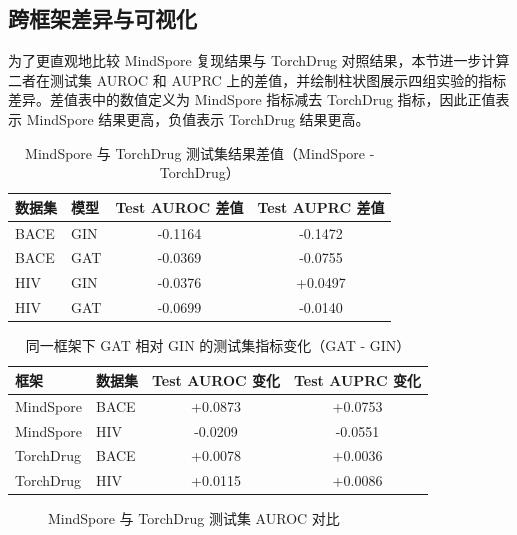 \documentclass[12pt,hyperref,a4paper,UTF8]{ctexart}
\begin{document}
\subsection{跨框架差异与可视化}

为了更直观地比较 MindSpore 复现结果与 TorchDrug 对照结果，本节进一步计算二者在测试集 AUROC 和 AUPRC 上的差值，并绘制柱状图展示四组实验的指标差异。差值表中的数值定义为 MindSpore 指标减去 TorchDrug 指标，因此正值表示 MindSpore 结果更高，负值表示 TorchDrug 结果更高。

\begin{table}[H]
  \centering
  \caption{MindSpore 与 TorchDrug 测试集结果差值（MindSpore - TorchDrug）}
  \label{tab:diff}
  \begin{tabular}{l l c c}
    \toprule
    数据集 & 模型 & Test AUROC 差值 & Test AUPRC 差值\\
    \midrule
    BACE & GIN & -0.1164 & -0.1472\\
    BACE & GAT & -0.0369 & -0.0755\\
    HIV  & GIN & -0.0376 & +0.0497\\
    HIV  & GAT & -0.0699 & -0.0140\\
    \bottomrule
  \end{tabular}
\end{table}

\begin{table}[H]
  \centering
  \caption{同一框架下 GAT 相对 GIN 的测试集指标变化（GAT - GIN）}
  \label{tab:model-delta}
  \begin{tabular}{l l c c}
    \toprule
    框架 & 数据集 & Test AUROC 变化 & Test AUPRC 变化\\
    \midrule
    MindSpore & BACE & +0.0873 & +0.0753\\
    MindSpore & HIV  & -0.0209 & -0.0551\\
    TorchDrug & BACE & +0.0078 & +0.0036\\
    TorchDrug & HIV  & +0.0115 & +0.0086\\
    \bottomrule
  \end{tabular}
\end{table}

\begin{figure}[H]
  \centering
  \caption{MindSpore 与 TorchDrug 测试集 AUROC 对比}
  \label{fig:auroc}
\end{figure}
\end{document}
